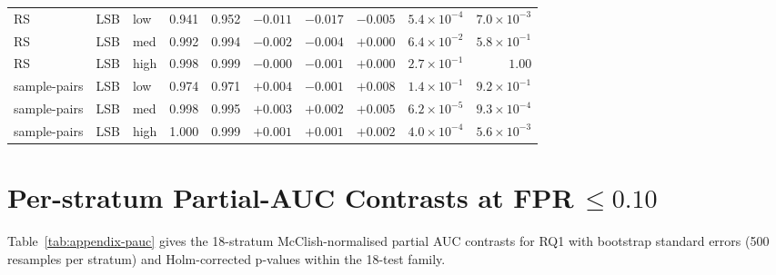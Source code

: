 \documentclass[10pt,twocolumn,a4paper]{article}
\begin{document}
\begin{table}[h]
\begin{tabular}{@{}l l l c c r r r r r@{}}
RS                   & LSB & low    & 0.941 & 0.952 & $-0.011$ & $-0.017$ & $-0.005$ & $5.4\!\times\!10^{-4}$  & $7.0\!\times\!10^{-3}$ \\
RS                   & LSB & med    & 0.992 & 0.994 & $-0.002$ & $-0.004$ & $+0.000$ & $6.4\!\times\!10^{-2}$  & $5.8\!\times\!10^{-1}$ \\
RS                   & LSB & high   & 0.998 & 0.999 & $-0.000$ & $-0.001$ & $+0.000$ & $2.7\!\times\!10^{-1}$  & $1.00$ \\
sample-pairs         & LSB & low    & 0.974 & 0.971 & $+0.004$ & $-0.001$ & $+0.008$ & $1.4\!\times\!10^{-1}$  & $9.2\!\times\!10^{-1}$ \\
sample-pairs         & LSB & med    & 0.998 & 0.995 & $+0.003$ & $+0.002$ & $+0.005$ & $6.2\!\times\!10^{-5}$  & $9.3\!\times\!10^{-4}$ \\
sample-pairs         & LSB & high   & 1.000 & 0.999 & $+0.001$ & $+0.001$ & $+0.002$ & $4.0\!\times\!10^{-4}$  & $5.6\!\times\!10^{-3}$ \\
\bottomrule
\end{tabular}
\end{table}

\section{Per-stratum Partial-AUC Contrasts at FPR\,$\leq\!0.10$}
\label{app:pauc-table}
Table~\ref{tab:appendix-pauc} gives the 18-stratum McClish-normalised partial AUC contrasts for RQ1 with bootstrap standard errors (500 resamples per stratum) and Holm-corrected p-values within the 18-test family.
\end{document}
